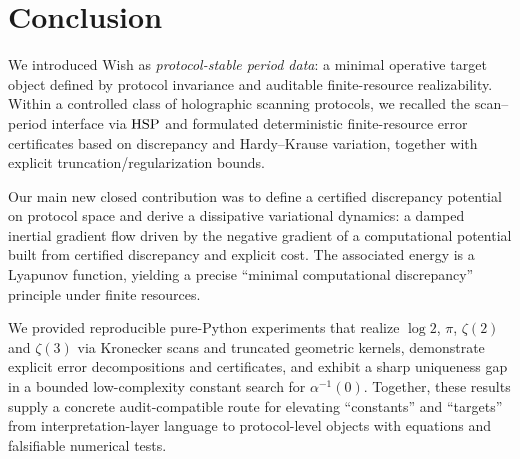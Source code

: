 
\section{Conclusion}
\label{sec:conclusion}

We introduced Wish as \emph{protocol-stable period data}: a minimal operative target object defined by protocol invariance and auditable finite-resource realizability.
Within a controlled class of holographic scanning protocols, we recalled the scan--period interface via $\mathrm{HSP}$ and formulated deterministic finite-resource error certificates based on discrepancy and Hardy--Krause variation, together with explicit truncation/regularization bounds.

Our main new closed contribution was to define a certified discrepancy potential on protocol space and derive a dissipative variational dynamics:
a damped inertial gradient flow driven by the negative gradient of a computational potential built from certified discrepancy and explicit cost.
The associated energy is a Lyapunov function, yielding a precise ``minimal computational discrepancy'' principle under finite resources.

We provided reproducible pure-Python experiments that realize $\log 2$, $\pi$, $\zeta(2)$ and $\zeta(3)$ via Kronecker scans and truncated geometric kernels, demonstrate explicit error decompositions and certificates, and exhibit a sharp uniqueness gap in a bounded low-complexity constant search for $\alpha^{-1}(0)$.
Together, these results supply a concrete audit-compatible route for elevating ``constants'' and ``targets'' from interpretation-layer language to protocol-level objects with equations and falsifiable numerical tests.


